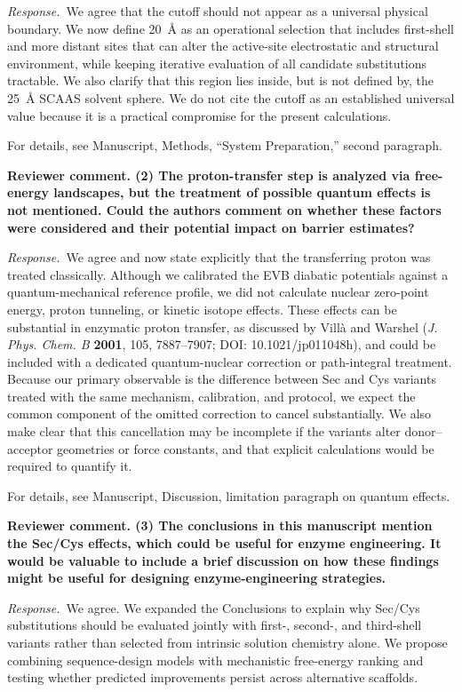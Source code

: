 \documentclass[11pt]{article}
\newcommand{\ReviewerComment}[1]{\par\noindent\textbf{Reviewer comment. #1}\par}
\newcommand{\AuthorResponse}{\par\noindent\textit{Response.}\ }
\newcommand{\Location}[1]{\par\noindent For details, see #1\par}
\begin{document}
\AuthorResponse We agree that the cutoff should not appear as a universal physical
boundary. We now define 20~\AA{} as an operational selection that includes
first-shell and more distant sites that can alter the active-site electrostatic and
structural environment, while keeping iterative evaluation of all candidate substitutions
tractable. We also clarify that this region lies inside, but is not defined by, the
25~\AA{} SCAAS solvent sphere. We do not cite the cutoff as an established universal
value because it is a practical compromise for the present calculations.

\Location{Manuscript, Methods, ``System Preparation,'' second paragraph.}

\ReviewerComment{(2) The proton-transfer step is analyzed via free-energy landscapes, but the treatment of possible quantum effects is not mentioned. Could the authors comment on whether these factors were considered and their potential impact on barrier estimates?}

\AuthorResponse We agree and now state explicitly that the transferring proton was treated
classically. Although we calibrated the EVB diabatic potentials against a quantum-mechanical
reference profile, we did not calculate nuclear zero-point energy, proton tunneling, or
kinetic isotope effects. These effects can be substantial in enzymatic proton transfer, as
discussed by Vill\`a and Warshel (\textit{J. Phys. Chem. B} \textbf{2001}, 105,
7887--7907; DOI: 10.1021/jp011048h), and could be included with a dedicated
quantum-nuclear correction or path-integral treatment. Because our primary observable is
the difference between Sec and Cys variants treated with the same mechanism, calibration,
and protocol, we expect the common component of the omitted correction to cancel
substantially. We also make clear that this cancellation may be incomplete if the variants
alter donor--acceptor geometries or force constants, and that explicit calculations would
be required to quantify it.

\Location{Manuscript, Discussion, limitation paragraph on quantum effects.}

\ReviewerComment{(3) The conclusions in this manuscript mention the Sec/Cys effects, which could be useful for enzyme engineering. It would be valuable to include a brief discussion on how these findings might be useful for designing enzyme-engineering strategies.}

\AuthorResponse We agree. We expanded the Conclusions to explain why Sec/Cys substitutions
should be evaluated jointly with first-, second-, and third-shell variants rather than
selected from intrinsic solution chemistry alone. We propose combining sequence-design
models with mechanistic free-energy ranking and testing whether predicted improvements
persist across alternative scaffolds.
\end{document}
